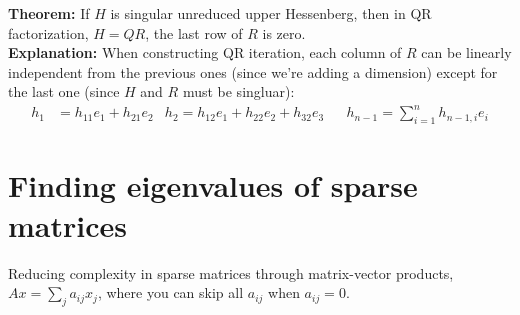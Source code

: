 \documentclass{article}
\begin{document}
\textbf{Theorem:} If $H$ is singular unreduced upper Hessenberg, then in QR factorization, $H=QR$, the last row of $R$ is zero.\\
\textbf{Explanation:} When constructing QR iteration, each column of $R$ can be linearly independent from the previous ones (since we're adding a dimension) except for the last one (since $H$ and $R$ must be singluar):
\begin{align*}
    h_1 &= h_{11}e_1 + h_{21}e_2 & h_2 = h_{12}e_1 + h_{22}e_2 + h_{32}e_3 && h_{n-1} = \sum_{i=1}^n h_{n-1,i}e_i
\end{align*}

\section{Finding eigenvalues of sparse matrices}
Reducing complexity in sparse matrices through matrix-vector products, $Ax = \sum_j a_{ij}x_j$, where you can skip all $a_{ij}$ when $a_{ij} = 0$. 
\end{document}
